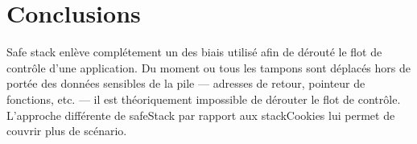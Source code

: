 \section{Conclusions}

\og Safe stack \fg enlève complétement un des biais utilisé afin de dérouté le flot de
contrôle d'une application. Du moment ou tous les tampons sont déplacés hors de portée
des données sensibles de la pile --- adresses de retour, pointeur de fonctions, etc.
--- il est théoriquement impossible de dérouter le flot de contrôle. L'approche
différente de \og \gls{safeStack} \fg par rapport aux \gls{stackCookies} \fg
lui permet de couvrir plus de scénario.
